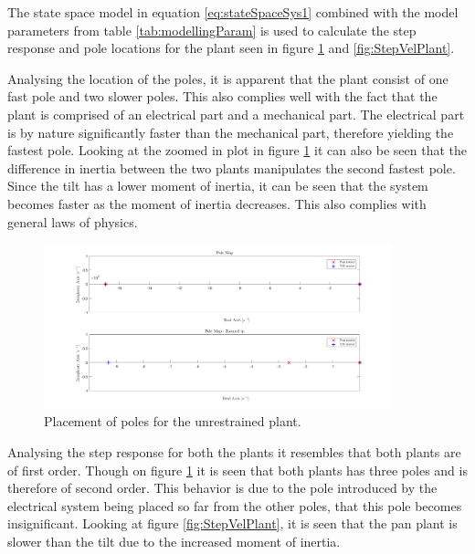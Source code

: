 \documentclass[../../main.tex]{subfiles}
\begin{document}
The state space model in equation \ref{eq:stateSpaceSys1} combined with the model parameters from table \ref{tab:modellingParam} is used to calculate the step response and pole locations for the plant seen in figure \ref{fig:polesPlant} and \ref{fig:StepVelPlant}.

Analysing the location of the poles, it is apparent that the plant consist of one fast pole and two slower poles. This also complies well with the fact that the plant is comprised of an electrical part and a mechanical part. The electrical part is by nature significantly faster than the mechanical part, therefore yielding the fastest pole. Looking at the zoomed in plot in figure \ref{fig:polesPlant} it can also be seen that the difference in inertia between the two plants manipulates the second fastest pole. Since the tilt has a lower moment of inertia, it can be seen that the system becomes faster as the moment of inertia decreases. This also complies with general laws of physics. 

\begin{figure}
    \centering
    \includegraphics[width = 0.9\textwidth]{Sections/System_Modelling/Images/polesPlant.png}
    \caption{Placement of poles for the unrestrained plant.}
    \label{fig:polesPlant}
\end{figure}

Analysing the step response for both the plants it resembles that both plants are of first order. Though on figure \ref{fig:polesPlant} it is seen that both plants has three poles and is therefore of second order. This behavior is due to the pole introduced by the electrical system being placed so far from the other poles, that this pole becomes insignificant. Looking at figure \ref{fig:StepVelPlant}, it is seen that the pan plant is slower than the tilt due to the increased moment of inertia.  
 
\end{document}
